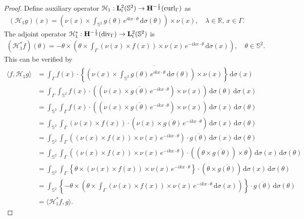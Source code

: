 \documentclass[a4paper,12pt]{article}
\theoremstyle{definition}
\newcommand\bdr{\Gamma}
\newcommand\Div{\divv_\bdr}
\newcommand\Curl{\curl_\bdr}
\newcommand\lTT{{\bf L}^2_\text{t}}
\newcommand\lTS{\lTT(\mathbb{S}^2)}
\newcommand\Hhm{{\bf H}^{-\frac{1}{2}}}
\newcommand\lTD{\Hhm(\Div)}
\newcommand\lTC{\Hhm(\Curl)}
\newcommand\ints[2][y]{\int_{\bdr}#2\,\text{d}\sigma(#1)}
\newcommand\intc[2][(\theta)]{\int_{\mathbb{S}^2}#2\,\text{d}\sigma#1}
\DeclareMathOperator\curl{curl}
\DeclareMathOperator\divv{div}
\begin{document}
\begin{proof}
  Define auxiliary operator $\mathcal{H}_1:\lTS\rightarrow\lTC$ as
  \begin{align}
    (\mathcal{H}_1 g)(x)=\left(\nu(x)\times\intc{g(\theta)\,e^{ikx\cdot\theta}}\right)\times\nu(x),\quad\lambda\in\mathbb{R},\,x\in\bdr.
  \end{align}
  The adjoint operator $\mathcal{H}_1^*:\lTD\rightarrow\lTS$ is 
  \begin{align}
    (\mathcal{H}_1^*f)(\theta)=-\theta\times\left(\theta\times\ints[x]{\left(\nu(x)\times f(x)\right)\times\nu(x)\,e^{-i k x\cdot\theta}}\right),\quad\theta\in\mathbb{S}^2.
  \end{align}
  This can be verified by
  \begin{align*}
    \langle f, \mathcal{H}_1 g\rangle &= \ints[x]{f(x)\cdot\overline{\left\{\left(\nu(x)\times\intc{g(\theta)\,e^{i k x\cdot\theta}}\right)\times\nu(x)\right\}}} \\
    &=\ints[x]{\intc{f(x)\cdot \left(\left(\nu(x)\times\overline{g(\theta)}\,e^{-i k x\cdot\theta}\right)\times\nu(x)\right)}} \\
    &=\intc{\ints[x]{f(x)\cdot \left(\left(\nu(x)\times\overline{g(\theta)}\,e^{-i k x\cdot\theta}\right)\times\nu(x)\right)}} \\
    &=\intc{\ints[x]{\left(\nu(x)\times f(x)\right)\cdot\left(\nu(x)\times\overline{g(\theta)}\,e^{-i k x\cdot\theta}\right)}} \\
    &=\intc{\ints[x]{\left(\left(\nu(x)\times f(x)\right)\times\nu(x)\,e^{-i k x\cdot\theta}\right)\cdot\overline{g(\theta)}}} \\
    &=\intc{\ints[x]{\left(\left(\nu(x)\times f(x)\right)\times\nu(x)\,e^{-i k x\cdot\theta}\right)\cdot\left(\left(\theta\times\overline{g(\theta)}\right)\times\theta\right)}} \\
    &=\intc{\ints[x]{\left\{\theta\times\left(\nu(x)\times f(x)\right)\times\nu(x)\,e^{-i k x\cdot\theta}\right\}\cdot\left(\theta\times\overline{g(\theta)}\right)}} \\
    &=\intc{\left\{-\theta\times\left(\theta\times\ints[x]{\left(\nu(x)\times f(x)\right)\times\nu(x)\,e^{-i k x\cdot\theta}}\right)\right\}\cdot\overline{g(\theta)}} \\
    &=\langle\mathcal{H}_1^*f, g\rangle.
  \end{align*} 


\end{proof}
\end{document}
